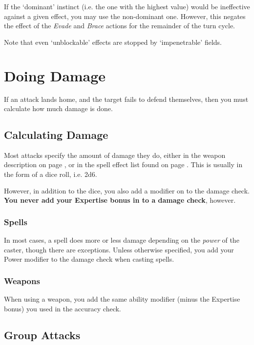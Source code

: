 If the `dominant' instinct (i.e. the one with the highest value) would be ineffective against a given effect, you may use the non-dominant one. However, this negates the effect of the {\it Evade} and {\it Brace} actions for the remainder of the turn cycle. 

Note that even `unblockable' effects are stopped by `impenetrable' fields. 



\section{Doing Damage} \label{S:Damage}

If an attack lands home, and the target fails to defend themselves, then you must calculate how much damage is done.

\subsection{Calculating Damage}

Most attacks specify the amount of damage they do, either in the weapon description on page \pageref{S:WeaponList}, or in the spell effect list found on page \pageref{S:SpellList}. This is usually in the form of a dice roll, i.e. 2d6.

However, in addition to the dice, you also add a modifier on to the damage check. {\bf You never add your Expertise bonus in to a damage check}, however. 

\subsubsection{Spells}

In most cases, a spell does more or less damage depending on the {\it power} of the caster, though there are exceptions. Unless otherwise specified, you add your Power modifier to the damage check when casting spells. 

\subsubsection{Weapons}

When using a weapon, you add the same ability modifier (minus the Expertise bonus) you used in the accuracy check. 

\subsection{Group Attacks}

